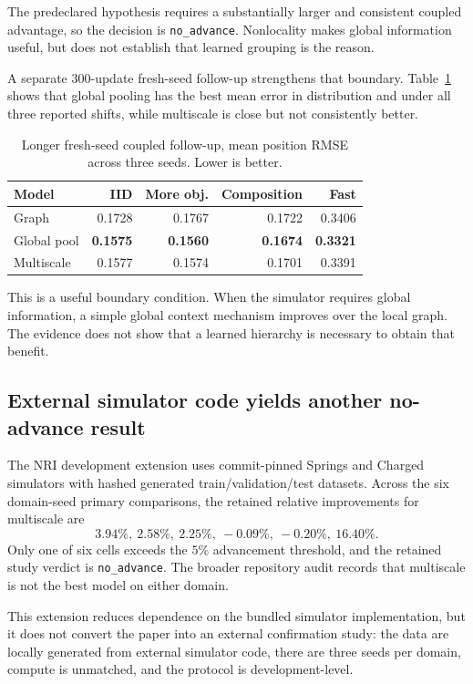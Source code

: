 \documentclass[10pt]{article}
\begin{document}
The predeclared hypothesis requires a substantially larger and consistent coupled advantage, so the decision is \texttt{no\_advance}. Nonlocality makes global information useful, but does not establish that learned grouping is the reason.

A separate $300$-update fresh-seed follow-up strengthens that boundary. Table~\ref{tab:coupled} shows that global pooling has the best mean error in distribution and under all three reported shifts, while multiscale is close but not consistently better.

\begin{table}[t]
\centering
\caption{Longer fresh-seed coupled follow-up, mean position RMSE across three seeds. Lower is better.}
\label{tab:coupled}
\begin{tabular}{lrrrr}
\toprule
Model & IID & More obj. & Composition & Fast\\
\midrule
Graph & 0.1728 & 0.1767 & 0.1722 & 0.3406\\
Global pool & \textbf{0.1575} & \textbf{0.1560} & \textbf{0.1674} & \textbf{0.3321}\\
Multiscale & 0.1577 & 0.1574 & 0.1701 & 0.3391\\
\bottomrule
\end{tabular}
\end{table}

This is a useful boundary condition. When the simulator requires global information, a simple global context mechanism improves over the local graph. The evidence does not show that a learned hierarchy is necessary to obtain that benefit.

\subsection{External simulator code yields another no-advance result}

The NRI development extension uses commit-pinned Springs and Charged simulators with hashed generated train/validation/test datasets. Across the six domain-seed primary comparisons, the retained relative improvements for multiscale are
\[
3.94\%,\ 2.58\%,\ 2.25\%,\ -0.09\%,\ -0.20\%,\ 16.40\%.
\]
Only one of six cells exceeds the $5\%$ advancement threshold, and the retained study verdict is \texttt{no\_advance}. The broader repository audit records that multiscale is not the best model on either domain.

This extension reduces dependence on the bundled simulator implementation, but it does not convert the paper into an external confirmation study: the data are locally generated from external simulator code, there are three seeds per domain, compute is unmatched, and the protocol is development-level.
\end{document}
